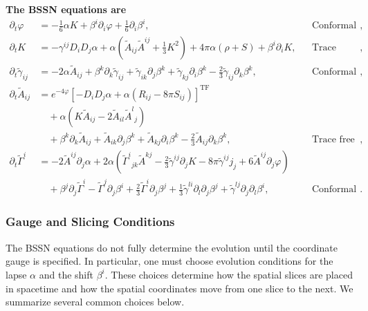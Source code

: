 \noindent\textbf{The BSSN equations are}
\begin{equation}
\boxed{
\begin{aligned}
\partial_t \varphi
&=
-\frac{1}{6}\alpha K
+
\beta^i \partial_i \varphi
+
\frac{1}{6}\partial_i \beta^i ,
&&\text{Conformal exponent evolution},
\\[0.75em]
%
\partial_t K
&=
-\gamma^{ij}D_iD_j\alpha
+
\alpha
\left(
\tilde{A}_{ij}\tilde{A}^{ij}
+
\frac{1}{3}K^2
\right)
+
4\pi\alpha(\rho+S)
+
\beta^i\partial_i K ,
&&\text{Trace evolution},
\\[0.75em]
%
\partial_t \tilde{\gamma}_{ij}
&=
-2\alpha\tilde{A}_{ij}
+
\beta^k\partial_k\tilde{\gamma}_{ij}
+
\tilde{\gamma}_{ik}\partial_j\beta^k
+
\tilde{\gamma}_{kj}\partial_i\beta^k
-
\frac{2}{3}\tilde{\gamma}_{ij}\partial_k\beta^k ,
&&\text{Conformal metric evolution},
\\[0.75em]
%
\partial_t \tilde{A}_{ij}
&=
e^{-4\varphi}
\left[
-D_iD_j\alpha
+
\alpha
\left(
R_{ij}
-
8\pi S_{ij}
\right)
\right]^{\mathrm{TF}}
\\
&\quad
+
\alpha
\left(
K\tilde{A}_{ij}
-
2\tilde{A}_{il}\tilde{A}^{l}{}_{j}
\right)
\\
&\quad
+
\beta^k\partial_k\tilde{A}_{ij}
+
\tilde{A}_{ik}\partial_j\beta^k
+
\tilde{A}_{kj}\partial_i\beta^k
-
\frac{2}{3}\tilde{A}_{ij}\partial_k\beta^k ,
&&\text{Trace free curvature evolution},
\\[0.75em]
%
\partial_t \tilde{\Gamma}^{i}
&=
-2\tilde{A}^{ij}\partial_j\alpha
+
2\alpha
\left(
\tilde{\Gamma}^{i}{}_{jk}\tilde{A}^{kj}
-
\frac{2}{3}\tilde{\gamma}^{ij}\partial_j K
-
8\pi\tilde{\gamma}^{ij}j_j
+
6\tilde{A}^{ij}\partial_j\varphi
\right)
\\
&\quad
+
\beta^j\partial_j\tilde{\Gamma}^{i}
-
\tilde{\Gamma}^{j}\partial_j\beta^i
+
\frac{2}{3}\tilde{\Gamma}^{i}\partial_j\beta^j
+
\frac{1}{3}\tilde{\gamma}^{li}\partial_l\partial_j\beta^j
+
\tilde{\gamma}^{lj}\partial_j\partial_l\beta^i ,
&&\text{Conformal connection evolution}.
\end{aligned}
}
\end{equation}

\subsubsection{Gauge and Slicing Conditions}

The BSSN equations do not fully determine the evolution until the coordinate gauge is specified. In particular, one must choose evolution conditions for the lapse $\alpha$ and the shift $\beta^i$. These choices determine how the spatial slices are placed in spacetime and how the spatial coordinates move from one slice to the next. We summarize several common choices below.

